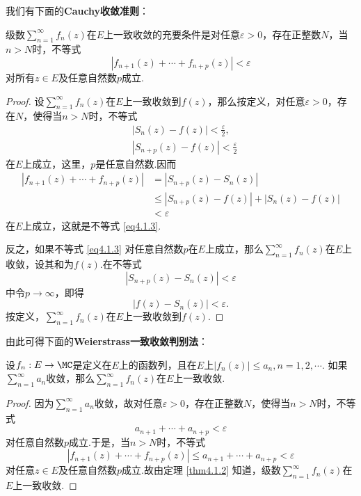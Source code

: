 我们有下面的\textbf{Cauchy收敛准则}：
\begin{theorem}\label{thm4.1.2}
级数$\sum_{n=1}^\infty f_n(z)$在$E$上一致收敛的充要条件是对任意$\varepsilon>0$，存在正整数$N$，当$n>N$时，不等式
\begin{equation}\label{eq4.1.3}
  |f_{n+1}(z)+\cdots+f_{n+p}(z)|<\varepsilon
\end{equation}
对所有$z\in E$及任意自然数$p$成立.
\end{theorem}
\begin{proof}
设$\sum_{n=1}^\infty f_n(z)$在$E$上一致收敛到$f(z)$，那么按定义，对任意$\varepsilon>0$，存在$N$，使得当$n>N$时，不等式
\begin{align*}
&|S_n(z)-f(z)|<\frac\varepsilon2,\\
&|S_{n+p}(z)-f(z)|<\frac\varepsilon2
\end{align*}
在$E$上成立，这里，$p$是任意自然数.因而
\begin{align*}
|f_{n+1}(z)+\cdots+f_{n+p}(z)|&=|S_{n+p}(z)-S_n(z)|\\
&\le|S_{n+p}(z)-f(z)|+|S_n(z)-f(z)|\\
&<\varepsilon
\end{align*}
在$E$上成立，这就是不等式 \eqref{eq4.1.3}.

反之，如果不等式 \eqref{eq4.1.3} 对任意自然数$p$在$E$上成立，那么$\sum_{n=1}^\infty f_n(z)$在$E$上收敛，设其和为$f(z)$.在不等式
\[|S_{n+p}(z)-S_n(z)|<\varepsilon\]
中令$p\to\infty$，即得
\[|f(z)-S_n(z)|<\varepsilon.\]
按定义，$\sum_{n=1}^\infty f_n(z)$在$E$上一致收敛到$f(z)$.
\end{proof}

由此可得下面的\textbf{Weierstrass一致收敛判别法}：
\begin{theorem}\label{thm4.1.3}
设$f_n:E\to\MC$是定义在$E$上的函数列，且在$E$上$|f_n(z)|\le a_n,n=1,2,\cdots$.
如果$\sum_{n=1}^\infty a_n$收敛，那么$\sum_{n=1}^\infty f_n(z)$在$E$上一致收敛.
\end{theorem}
\begin{proof}
因为$\sum_{n=1}^\infty a_n$收敛，故对任意$\varepsilon>0$，存在正整数$N$，使得当$n>N$时，不等式
\[a_{n+1}+\cdots+a_{n+p}<\varepsilon\]
对任意自然数$p$成立.于是，当$n>N$时，不等式
\[|f_{n+1}(z)+\cdots+f_{n+p}(z)|\le a_{n+1}+\cdots+a_{n+p}<\varepsilon\]
对任意$z\in E$及任意自然数$p$成立.故由定理 \ref{thm4.1.2} 知道，级数$\sum_{n=1}^\infty f_n(z)$在$E$上一致收敛.
\end{proof}

